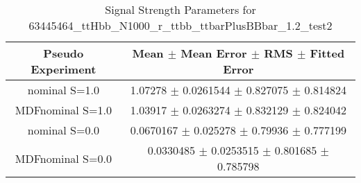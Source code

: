\begin{table}
\centering
\caption{Signal Strength Parameters for 63445464\_ttHbb\_N1000\_r\_ttbb\_ttbarPlusBBbar\_1.2\_test2}
\begin{tabular}{cc}
\toprule
Pseudo Experiment & Mean $\pm$ Mean Error $\pm$ RMS $\pm$ Fitted Error\\
\midrule
nominal S=1.0 & \num{1.07278} $\pm$ \num{0.0261544} $\pm$ \num{0.827075} $\pm$ \num{0.814824}\\
MDFnominal S=1.0 & \num{1.03917} $\pm$ \num{0.0263274} $\pm$ \num{0.832129} $\pm$ \num{0.824042}\\
nominal S=0.0 & \num{0.0670167} $\pm$ \num{0.025278} $\pm$ \num{0.79936} $\pm$ \num{0.777199}\\
MDFnominal S=0.0 & \num{0.0330485} $\pm$ \num{0.0253515} $\pm$ \num{0.801685} $\pm$ \num{0.785798}\\
\bottomrule
\end{tabular}
\end{table}